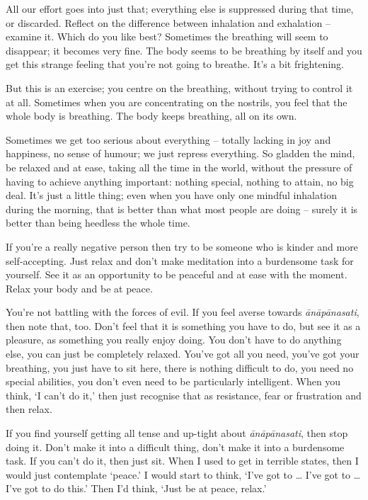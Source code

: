 All our effort goes into just that; everything else is suppressed during that time, or discarded. Reflect on the difference between inhalation and exhalation -- examine it. Which do you like best? Sometimes the breathing will seem to disappear; it becomes very fine. The body seems to be breathing by itself and you get this strange feeling that you're not going to breathe. It's a bit frightening.

But this is an exercise; you centre on the breathing, without trying to control it at all. Sometimes when you are concentrating on the nostrils, you feel that the whole body is breathing. The body keeps breathing, all on its own.

Sometimes we get too serious about everything -- totally lacking in joy and happiness, no sense of humour; we just repress everything. So gladden the mind, be relaxed and at ease, taking all the time in the world, without the pressure of having to achieve anything important: nothing special, nothing to attain, no big deal. It's just a little thing; even when you have only one mindful inhalation during the morning, that is better than what most people are doing -- surely it is better than being heedless the whole time.

If you're a really negative person then try to be someone who is kinder and more self-accepting. Just relax and don't make meditation into a burdensome task for yourself. See it as an opportunity to be peaceful and at ease with the moment. Relax your body and be at peace.

You're not battling with the forces of evil. If you feel averse towards \textit{ānāpānasati}, then note that, too. Don't feel that it is something you have to do, but see it as a pleasure, as something you really enjoy doing. You don't have to do anything else, you can just be completely relaxed. You've got all you need, you've got your breathing, you just have to sit here, there is nothing difficult to do, you need no special abilities, you don't even need to be particularly intelligent. When you think, `I can't do it,' then just recognise that as resistance, fear or frustration and then relax.

If you find yourself getting all tense and up-tight about \textit{ānāpānasati}, then stop doing it. Don't make it into a difficult thing, don't make it into a burdensome task. If you can't do it, then just sit. When I used to get in terrible states, then I would just contemplate `peace.' I would start to think, `I've got to \ldots{} I've got to \ldots{} I've got to do this.' Then I'd think, `Just be at peace, relax.'

